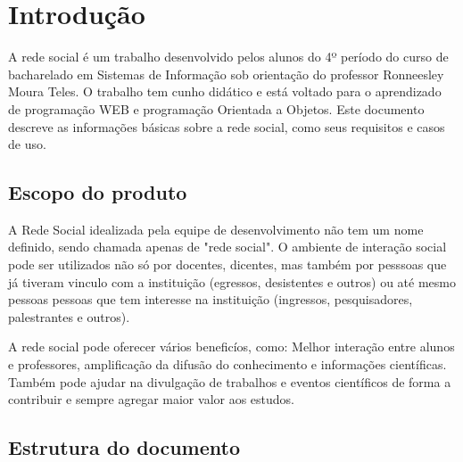 \chapter{Introdução}

A rede social é um trabalho desenvolvido pelos alunos do 4º período do curso de bacharelado em Sistemas de Informação sob orientação do professor Ronneesley Moura Teles.
O trabalho tem cunho didático e está voltado para o aprendizado de programação WEB e programação Orientada a Objetos.
Este documento descreve as informações básicas sobre a rede social, como seus requisitos e casos de uso.


\section{Escopo do produto}
A Rede Social idealizada pela equipe de desenvolvimento não tem um nome definido, sendo chamada apenas de "rede social".
O ambiente de interação social pode ser utilizados não só por docentes, dicentes, mas também por pesssoas que já tiveram vinculo com a instituição (egressos, desistentes e outros) ou até mesmo
pessoas pessoas que tem interesse na instituição (ingressos, pesquisadores, palestrantes e outros).

A rede social pode oferecer vários beneficíos, como: Melhor interação entre alunos e professores, amplificação da difusão do conhecimento e informações científicas.
Também pode ajudar na divulgação de trabalhos e eventos científicos de forma a contribuir e sempre agregar maior valor aos estudos.
  

\section{Estrutura do documento}

